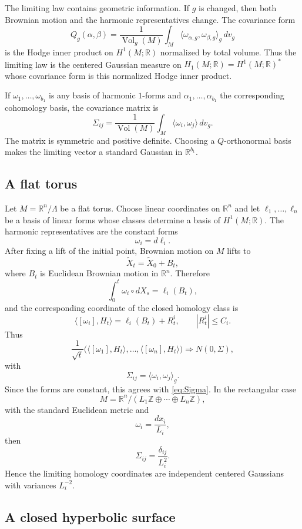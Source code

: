 \documentclass[a4paper,reqno]{amsart}
\newcommand{\R}{\mathbb R}
\newcommand{\Z}{\mathbb Z}
\newcommand{\Vol}{\operatorname{Vol}}
\theoremstyle{definition}
\begin{document}
The limiting law contains geometric information.  If $g$ is changed, then both Brownian motion and the harmonic representatives change.  The covariance form
\[
   Q_g(\alpha,\beta)
   =\frac{1}{\Vol_g(M)}
    \int_M\langle\omega_{\alpha,g},\omega_{\beta,g}\rangle_g\,dv_g
\]
is the Hodge inner product on $H^1(M;\R)$ normalized by total volume.  Thus the limiting law is the centered Gaussian measure on $H_1(M;\R)=H^1(M;\R)^*$ whose covariance form is this normalized Hodge inner product.

If $\omega_1,\ldots,\omega_{b_1}$ is any basis of harmonic $1$-forms and $\alpha_1,\ldots,\alpha_{b_1}$ the corresponding cohomology basis, the covariance matrix is
\begin{equation}\label{eq:Sigma}
   \Sigma_{ij}
   =\frac{1}{\Vol(M)}
    \int_M\langle\omega_i,\omega_j\rangle\,dv_g.
\end{equation}
The matrix is symmetric and positive definite.  Choosing a $Q$-orthonormal basis makes the limiting vector a standard Gaussian in $\R^{b_1}$.

\subsection{A flat torus}

Let $M=\R^n/\Lambda$ be a flat torus.  Choose linear coordinates on $\R^n$ and let $\ell_1,\ldots,\ell_n$ be a basis of linear forms whose classes determine a basis of $H^1(M;\R)$.  The harmonic representatives are the constant forms
\[
   \omega_i=d\ell_i.
\]
After fixing a lift of the initial point, Brownian motion on $M$ lifts to
\[
   \widetilde X_t=\widetilde X_0+B_t,
\]
where $B_t$ is Euclidean Brownian motion in $\R^n$.  Therefore
\[
   \int_0^t\omega_i\circ dX_s
   =\ell_i(B_t),
\]
and the corresponding coordinate of the closed homology class is
\[
   \langle[\omega_i],H_t\rangle
   =\ell_i(B_t)+R_t^i,
   \qquad |R_t^i|\le C_i.
\]
Thus
\[
   \frac{1}{\sqrt t}
   \bigl(\langle[\omega_1],H_t\rangle,\ldots,
   \langle[\omega_n],H_t\rangle\bigr)
   \Longrightarrow N(0,\Sigma),
\]
with
\[
   \Sigma_{ij}=\langle\omega_i,\omega_j\rangle_g.
\]
Since the forms are constant, this agrees with \eqref{eq:Sigma}.  In the rectangular case
\[
   M=\R^n/(L_1\Z\oplus\cdots\oplus L_n\Z),
\]
with the standard Euclidean metric and
\[
   \omega_i=\frac{dx_i}{L_i},
\]
then
\[
   \Sigma_{ij}=\frac{\delta_{ij}}{L_i^2}.
\]
Hence the limiting homology coordinates are independent centered Gaussians with variances $L_i^{-2}$.

\subsection{A closed hyperbolic surface}
\end{document}
